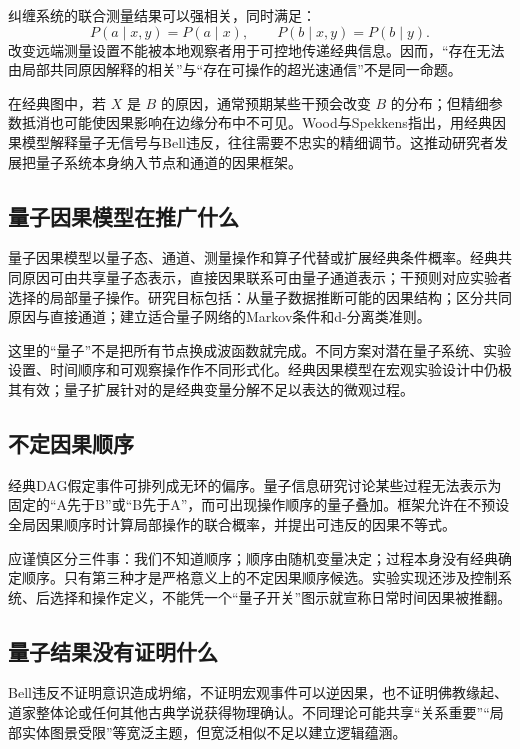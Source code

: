 纠缠系统的联合测量结果可以强相关，同时满足：
\[
P(a\mid x,y)=P(a\mid x),\qquad
P(b\mid x,y)=P(b\mid y).
\]
改变远端测量设置不能被本地观察者用于可控地传递经典信息。因而，“存在无法由局部共同原因解释的相关”与“存在可操作的超光速通信”不是同一命题。

在经典图中，若 $X$ 是 $B$ 的原因，通常预期某些干预会改变 $B$ 的分布；但精细参数抵消也可能使因果影响在边缘分布中不可见。Wood与Spekkens指出，用经典因果模型解释量子无信号与Bell违反，往往需要不忠实的精细调节\parencite{woodspekkens2015}。这推动研究者发展把量子系统本身纳入节点和通道的因果框架。

\subsection{量子因果模型在推广什么}

量子因果模型以量子态、通道、测量操作和算子代替或扩展经典条件概率。经典共同原因可由共享量子态表示，直接因果联系可由量子通道表示；干预则对应实验者选择的局部量子操作。研究目标包括：从量子数据推断可能的因果结构；区分共同原因与直接通道；建立适合量子网络的Markov条件和d-分离类准则\parencite{costashrapnel2016,allen2017}。

这里的“量子”不是把所有节点换成波函数就完成。不同方案对潜在量子系统、实验设置、时间顺序和可观察操作作不同形式化。经典因果模型在宏观实验设计中仍极其有效；量子扩展针对的是经典变量分解不足以表达的微观过程。

\subsection{不定因果顺序}

经典DAG假定事件可排列成无环的偏序。量子信息研究讨论某些过程无法表示为固定的“A先于B”或“B先于A”，而可出现操作顺序的量子叠加。框架允许在不预设全局因果顺序时计算局部操作的联合概率，并提出可违反的因果不等式\parencite{oreshkov2012}。

应谨慎区分三件事：我们不知道顺序；顺序由随机变量决定；过程本身没有经典确定顺序。只有第三种才是严格意义上的不定因果顺序候选。实验实现还涉及控制系统、后选择和操作定义，不能凭一个“量子开关”图示就宣称日常时间因果被推翻。

\subsection{量子结果没有证明什么}

Bell违反不证明意识造成坍缩，不证明宏观事件可以逆因果，也不证明佛教缘起、道家整体论或任何其他古典学说获得物理确认。不同理论可能共享“关系重要”“局部实体图景受限”等宽泛主题，但宽泛相似不足以建立逻辑蕴涵。

